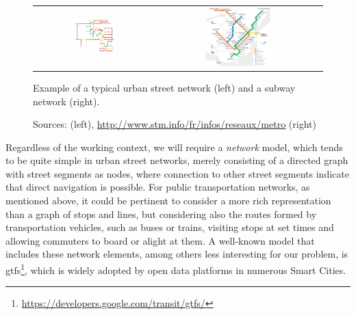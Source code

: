 \documentclass[a4paper,10pt,twoside]{book}
\begin{document}
	\begin{figure}[t]
		\begin{center}
			\begin{tabular}{cc}
				\includegraphics[width=0.4\textwidth]{figures/road-network.png} &
				\includegraphics[width=0.4\textwidth]{figures/mtl-metro-cut.png} \\
			\end{tabular}
		\end{center}
		\caption{Example of a typical urban street network (left) and a subway network (right).}
		\caption*{\small Sources: \cite{boeing2017osmnx} (left), \url{http://www.stm.info/fr/infos/reseaux/metro} (right)}
		\label{fig:networks}
	\end{figure}
	
	Regardless of the working context, we will require a \textit{network} model, which tends to be quite simple in urban street networks, merely consisting of a directed graph with street segments as nodes, where connection to other street segments indicate that direct navigation is possible. For public transportation networks, as mentioned above, it could be pertinent to consider a more rich representation than a graph of stops and lines, but considering also the routes formed by transportation vehicles, such as buses or trains, visiting stops at set times and allowing commuters to board or alight at them. A well-known model that includes these network elements, among others less interesting for our problem, is \gls{gtfs}\footnote{\url{https://developers.google.com/transit/gtfs/}}, which is widely adopted by open data platforms in numerous Smart Cities.
	
\end{document}
